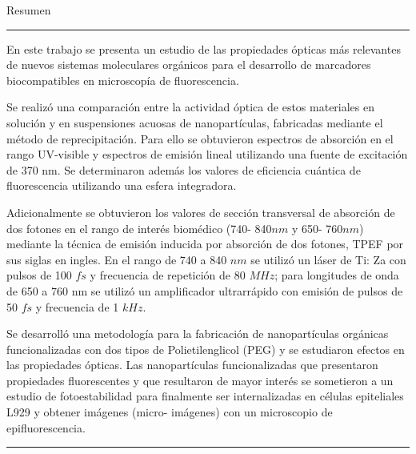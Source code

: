 \begin{vcenterpage}
{\LARGE{\sc Resumen}}

\noindent\rule[2pt]{\textwidth}{0.5pt}
En este trabajo se presenta un estudio de las propiedades \'opticas m\'as relevantes de nuevos sistemas moleculares org\'anicos para el desarrollo de marcadores biocompatibles en microscop\'ia de fluorescencia.

Se realiz\'o una comparaci\'on entre la actividad \'optica de estos materiales en soluci\'on y en suspensiones acuosas de nanopart\'iculas, fabricadas mediante el m\'etodo de reprecipitaci\'on. Para ello se obtuvieron espectros de absorci\'on en el rango UV-visible y espectros de emisi\'on lineal utilizando una fuente de excitaci\'on de 370 nm. Se determinaron adem\'as los valores de eficiencia cu\'antica de fluorescencia utilizando una esfera integradora. 

Adicionalmente se obtuvieron los valores de secci\'on transversal de absorci\'on de dos fotones en el rango de inter\'es biom\'edico (740- 840$nm$ y 650- 760$nm$) mediante la t\'ecnica de emisi\'on inducida por absorci\'on de dos fotones, TPEF por sus siglas en ingles. En el rango de 740 a 840 $nm$ se utiliz\'o un l\'aser de Ti: Za con pulsos de 100 $fs$ y frecuencia de repetici\'on de 80 $MHz$; para longitudes de onda de 650 a 760 nm se utiliz\'o un amplificador ultrarr\'apido con emisi\'on de pulsos de 50 $fs$ y frecuencia de 1 $kHz$.
	
Se desarroll\'o una metodolog\'ia para la fabricaci\'on de nanopart\'iculas org\'anicas funcionalizadas con dos tipos de Polietilenglicol (PEG) y se estudiaron efectos en las propiedades \'opticas. Las nanopart\'iculas funcionalizadas que presentaron propiedades fluorescentes y que resultaron de mayor inter\'es se sometieron a un estudio de fotoestabilidad para finalmente ser internalizadas en c\'elulas epiteliales L929 y obtener im\'agenes (micro- im\'agenes) con un microscopio de epifluorescencia.


\noindent\rule[2pt]{\textwidth}{0.5pt}
\end{vcenterpage}
